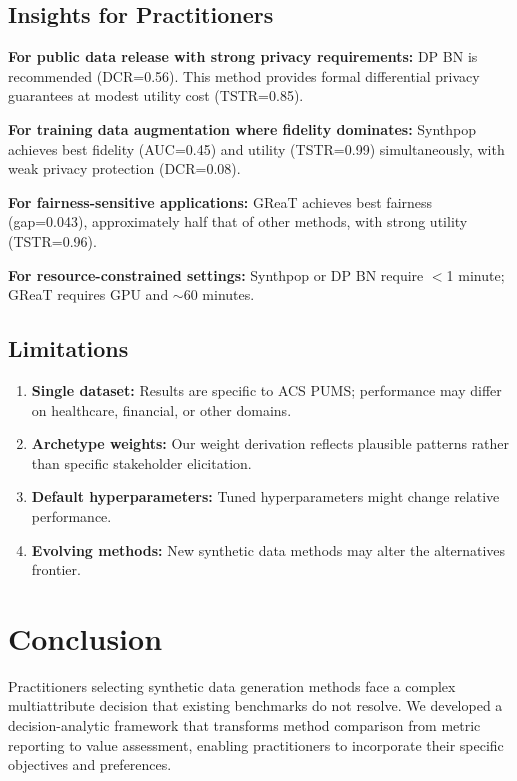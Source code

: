 \documentclass[12pt,a4paper]{article}
\begin{document}
\subsection{Insights for Practitioners}

\textbf{For public data release with strong privacy requirements:} DP BN is recommended (DCR=0.56). This method provides formal differential privacy guarantees at modest utility cost (TSTR=0.85).

\textbf{For training data augmentation where fidelity dominates:} Synthpop achieves best fidelity (AUC=0.45) and utility (TSTR=0.99) simultaneously, with weak privacy protection (DCR=0.08).

\textbf{For fairness-sensitive applications:} GReaT achieves best fairness (gap=0.043), approximately half that of other methods, with strong utility (TSTR=0.96).

\textbf{For resource-constrained settings:} Synthpop or DP BN require $<$1 minute; GReaT requires GPU and $\sim$60 minutes.

\subsection{Limitations}

\begin{enumerate}
    \item \textbf{Single dataset:} Results are specific to ACS PUMS; performance may differ on healthcare, financial, or other domains.
    \item \textbf{Archetype weights:} Our weight derivation reflects plausible patterns rather than specific stakeholder elicitation.
    \item \textbf{Default hyperparameters:} Tuned hyperparameters might change relative performance.
    \item \textbf{Evolving methods:} New synthetic data methods may alter the alternatives frontier.
\end{enumerate}

\section{Conclusion}

Practitioners selecting synthetic data generation methods face a complex multiattribute decision that existing benchmarks do not resolve. We developed a decision-analytic framework that transforms method comparison from metric reporting to value assessment, enabling practitioners to incorporate their specific objectives and preferences.
\end{document}
